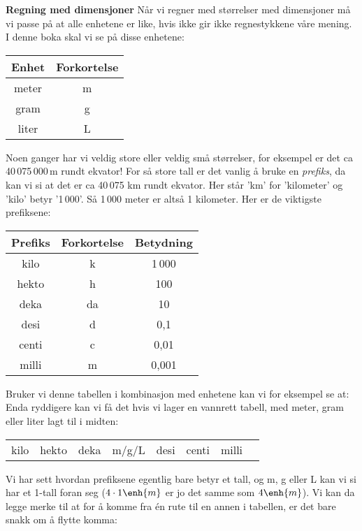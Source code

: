 \textbf{Regning med dimensjoner}\os
Når vi regner med størrelser med dimensjoner må vi passe på at alle enhetene er like, hvis ikke gir ikke regnestykkene våre mening. I denne boka skal vi se på disse enhetene:
\tbs
\begin{center}
	\begin{tabular}{c|c}
		\textbf{Enhet} & \textbf{Forkortelse} \\ \hline
		meter & m \\\hline
		gram & g \\\hline
		liter & L
	\end{tabular}
\end{center}\tbs
Noen ganger har vi veldig store eller veldig små størrelser, for eksempel er det ca 40\,075\,000\,m rundt ekvator! For så store tall er det vanlig å bruke en \textit{prefiks}, da kan vi si at det er ca 40\,075 km rundt ekvator. Her står 'km' for 'kilometer' og 'kilo' betyr '1\,000'. Så 1\,000 meter er altså 1 kilometer. Her er de viktigste prefiksene:\tbs
\begin{center}
	\begin{tabular}{c|c|c}
		\textbf{Prefiks} & \textbf{Forkortelse}&\textbf{Betydning} \\ \hline
		kilo & k & 1\,000\\\hline
		hekto & h & 100\\\hline
		deka & da & 10\\\hline
		desi & d & 0,1\\\hline
		centi & c & 0,01\\\hline
		milli & m & 0,001\\\hline		
	\end{tabular}
\end{center}\tbs
Bruker vi denne tabellen i kombinasjon med enhetene kan vi for eksempel se at:\vs
{}
Enda ryddigere kan vi få det hvis vi lager en vannrett tabell, med meter, gram eller liter lagt til i midten:
\begin{center}
	\begin{tabular}{|c|c|c|c|c|c|c|c}
		kilo &
		hekto &
		deka & m/g/L &
		desi & 
		centi & 
		milli & 		
	\end{tabular}
\end{center}
Vi har sett hvordan prefiksene egentlig bare betyr et tall, og m, g eller L kan vi si har et 1-tall foran seg ($ {4\cdot1\enh{m}} $ er jo det samme som $ 4\enh{m} $). Vi kan da legge merke til at for å komme fra én rute til en annen i tabellen, er det bare snakk om å flytte komma:
